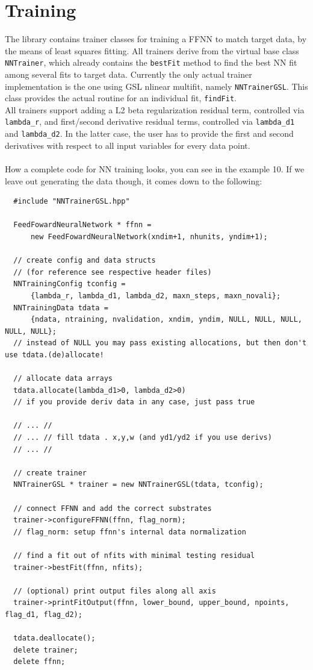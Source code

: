 \documentclass[11pt,a4paper,twoside]{article}
\begin{document}

\section{Training} %
\label{sec:training}

The library contains trainer classes for training a FFNN to match target data,
by the means of least squares fitting. All trainers derive from the virtual base class
\verb+NNTrainer+, which already contains the \verb+bestFit+ method to find the
best NN fit among several fits to target data.
Currently the only actual trainer implementation is the one using GSL nlinear
multifit, namely \verb+NNTrainerGSL+. This class provides the actual routine for
an individual fit, \verb+findFit+.
\\All trainers support adding a L2 beta regularization residual term, controlled via
\verb+lambda_r+, and first/second derivative residual terms, controlled via
\verb+lambda_d1+ and \verb+lambda_d2+. In the latter case, the user has to
provide the first and second derivatives with respect to all input variables for
every data point.
\\\\How a complete code for NN training looks, you can see in the example 10.
If we leave out generating the data though, it comes down to the following:
\begin{lstlisting}
  #include "NNTrainerGSL.hpp"

  FeedFowardNeuralNetwork * ffnn =
      new FeedFowardNeuralNetwork(xndim+1, nhunits, yndim+1);

  // create config and data structs
  // (for reference see respective header files)
  NNTrainingConfig tconfig =
      {lambda_r, lambda_d1, lambda_d2, maxn_steps, maxn_novali};
  NNTrainingData tdata =
      {ndata, ntraining, nvalidation, xndim, yndim, NULL, NULL, NULL, NULL, NULL};
  // instead of NULL you may pass existing allocations, but then don't use tdata.(de)allocate!  

  // allocate data arrays
  tdata.allocate(lambda_d1>0, lambda_d2>0)
  // if you provide deriv data in any case, just pass true

  // ... //
  // ... // fill tdata . x,y,w (and yd1/yd2 if you use derivs)
  // ... //

  // create trainer
  NNTrainerGSL * trainer = new NNTrainerGSL(tdata, tconfig);

  // connect FFNN and add the correct substrates
  trainer->configureFFNN(ffnn, flag_norm);
  // flag_norm: setup ffnn's internal data normalization

  // find a fit out of nfits with minimal testing residual
  trainer->bestFit(ffnn, nfits);

  // (optional) print output files along all axis
  trainer->printFitOutput(ffnn, lower_bound, upper_bound, npoints, flag_d1, flag_d2);

  tdata.deallocate();
  delete trainer;
  delete ffnn;

\end{lstlisting}
\end{document}

